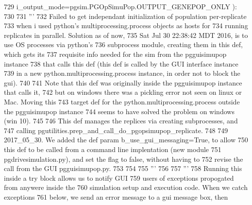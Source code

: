 \begin{DoxyCode}
729                                         i\_output\_mode=pgsim.PGOpSimuPop.OUTPUT\_GENEPOP\_ONLY ):
730 
731     \textcolor{stringliteral}{'''}
732 \textcolor{stringliteral}{    Failed to get independant initialization of population per-replicate}
733 \textcolor{stringliteral}{    when i used python's multiprocessing.process objects as hosts for }
734 \textcolor{stringliteral}{    running replicates in parallel.  Solution as of now, }
735 \textcolor{stringliteral}{    Sat Jul 30 22:38:42 MDT 2016, is to use OS processes via python's }
736 \textcolor{stringliteral}{    subprocess module, creating them in this def, which gets its}
737 \textcolor{stringliteral}{    requisite info needed for the sim from the pgguisimupop instance}
738 \textcolor{stringliteral}{    that calls this def (this def is called by the GUI interface instance}
739 \textcolor{stringliteral}{    in a new python.multiprocessing.process instance, in order not to block the gui).}
740 \textcolor{stringliteral}{}
741 \textcolor{stringliteral}{    Note that this def was originally inside the pgguisimupop instance that calls it,}
742 \textcolor{stringliteral}{    but on windows there was a pickling error not seen on linux or Mac.  Moving this}
743 \textcolor{stringliteral}{    target def for the python.multiprocessing.process outside the pgguisimupop instance}
744 \textcolor{stringliteral}{    seems to have solved the problem on windows (win 10).}
745 \textcolor{stringliteral}{}
746 \textcolor{stringliteral}{    This def manages the replices via creating subprocesses, and }
747 \textcolor{stringliteral}{    calling pgutilities.prep\_and\_call\_do\_pgopsimupop\_replicate.}
748 \textcolor{stringliteral}{}
749 \textcolor{stringliteral}{    2017\_05\_30.  We added the def param b\_use\_gui\_messaging=True, to allow}
750 \textcolor{stringliteral}{    this def to be called from a command line implentation (new module }
751 \textcolor{stringliteral}{    pgdrivesimulation.py), and set the flag to false, without having to}
752 \textcolor{stringliteral}{    revise the call from the GUI pgguisimupop.py.}
753 \textcolor{stringliteral}{}
754 \textcolor{stringliteral}{}
755 \textcolor{stringliteral}{    '''} 
756 
757     \textcolor{stringliteral}{''' }
758 \textcolor{stringliteral}{    Running this inside a try block allows us to notify GUI}
759 \textcolor{stringliteral}{    users of exceptions propogated from anywere inside the }
760 \textcolor{stringliteral}{    simulation setup and execution code. When we catch exceptions }
761 \textcolor{stringliteral}{    below, we send an error message to a gui message box, then}

\end{DoxyCode}
